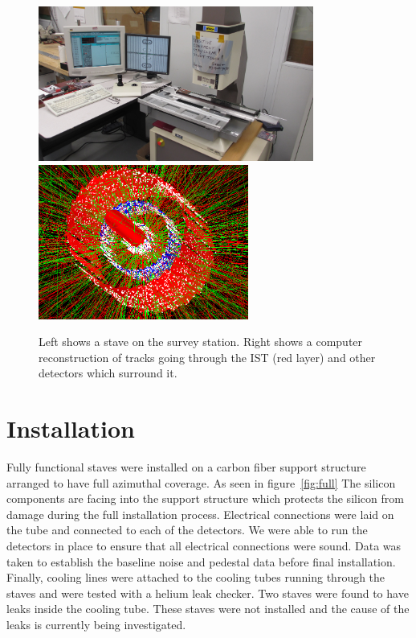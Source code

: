 \documentclass[preprint,12pt]{elsarticle}
\begin{document}
\begin{figure}[h]
\begin{center}
\includegraphics[height=2in, keepaspectratio=true, angle=0]{graphics/survey.jpg}
\includegraphics[height=2in, keepaspectratio=true, angle=0]{graphics/event.png}
\caption{Left shows a stave on the survey station.  Right shows a computer
reconstruction of tracks going through the IST (red layer) and other detectors which
surround it.
\label{fig:survey}}
\end{center}
\end{figure}
%
\section{Installation}
Fully functional staves were installed on a carbon fiber support structure
arranged to have full azimuthal coverage. As seen in figure~\ref{fig:full} The silicon components are facing
into the support structure which protects the silicon from damage during the
full installation process. Electrical connections were laid on the tube and
connected to each of the detectors. We were able to run the detectors in place
to ensure that all electrical connections were sound. Data was taken to establish
the baseline noise and pedestal data before final installation. Finally, cooling
lines were attached to the cooling tubes running through the staves and were
tested with a helium leak checker. Two staves were found to have leaks inside
the cooling tube. These staves were not installed and the cause of the leaks is
currently being investigated.
\end{document}
